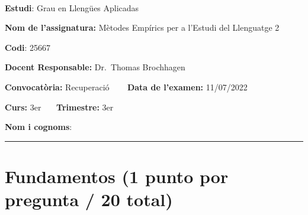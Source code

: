 \documentclass[
]{article}
\author{}
\date{\vspace{-2.5em}}
\begin{document}
~

\textbf{Estudi}: Grau en Llengües Aplicadas

\textbf{Nom de l'assignatura:} Mètodes Empírics per a l'Estudi del
Llenguatge 2

\textbf{Codi}: 25667

\textbf{Docent Responsable:} Dr.~Thomas Brochhagen

\textbf{Convocatòria:} Recuperació ~~~ \textbf{Data de l'examen:}
11/07/2022

\textbf{Curs:} 3er ~~~\textbf{Trimestre:} 3er

\textbf{Nom i cognoms}:

\begin{center}\rule{0.5\linewidth}{0.5pt}\end{center}

\hypertarget{fundamentos-1-punto-por-pregunta-20-total}{%
\section{Fundamentos (1 punto por pregunta / 20
total)}\label{fundamentos-1-punto-por-pregunta-20-total}}
\end{document}
